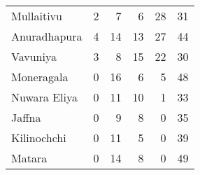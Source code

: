 \begin{tabular}{lrrrrr}
Mullaitivu   &           2 &           7 &            6 &               28 &          31 \\
Anuradhapura &           4 &          14 &           13 &               27 &          44 \\
Vavuniya     &           3 &           8 &           15 &               22 &          30 \\
Moneragala   &           0 &          16 &            6 &                5 &          48 \\
Nuwara Eliya &           0 &          11 &           10 &                1 &          33 \\
Jaffna       &           0 &           9 &            8 &                0 &          35 \\
Kilinochchi  &           0 &          11 &            5 &                0 &          39 \\
Matara       &           0 &          14 &            8 &                0 &          49 \\
\bottomrule
\end{tabular}
